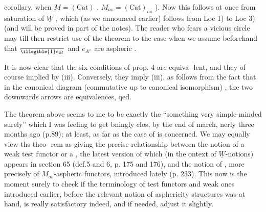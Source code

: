 corollary,  when $M = (\mathrm{Cat})$ ,  $M_{as} = (\mathrm{Cat})_{as}$ ).  Now this follows at once
from  saturation of $\underline{W}$ ,  which (as we announced earlier) follows from
Loc 1)  to  Loc 3)  (and will be proved in  part  of the notes).
The reader who fears a vicious circle may till then restrict 
use of the theorem to the case when we assume beforehand that $\over{\illegible{1}}{e}_M$ and
$e_{A^\wedge}$ are aspheric .

It is now clear that the six conditions of prop. 4  are equiva-%
lent,  and they   of course  implied by (iii).  Conversely,
they imply (iii),  as follows from the fact that in the canonical diagram
(commutative up to canonical isomorphism)
,
the two downwards arrows are equivalences,  qed.

The theorem above seems to me to be exactly the ``something very
simple-minded surely'' which I was feeling to get bningly clos, by
the end of march,  nerly three months ago (p.89);  at least,  as far as
the case of \hand{\uline{\textcolor{black}{test-functors}}} is concerned.  We may equally view ths theo-%
rem as giving the precise relationship between the notion of a weak test
functor or a \hand{\uline{\textcolor{black}{test functor}}}, \hand{(}the latest version of which (in the ontext
of $\underline{W}$-notions)  appears in section 65  (def.5 and 6,  p. 175 and 176)\hand{)},
and the notion of \hand{\uline{\textcolor{black}{aspheric functors}}},  more precisely of $M_{as}$-aspheric
functors,  introduced lately (p. 233).  This now is the moment surely
to check if the terminology of test functors and weak ones  introduced
earlier,  before the relevant notion of asphericity structures was at
hand,  is really satisfactory indeed,  and if needed,  adjust it slightly.

